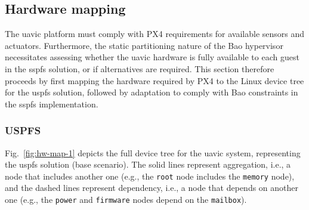 

\subsection{Hardware mapping}
\label{sec:hardware-mapping}
The \gls{uavic} platform must comply with PX4 requirements for available
sensors and actuators. Furthermore, the static partitioning nature of the
Bao hypervisor necessitates assessing whether the \gls{uavic} hardware is fully
available to each guest in the \gls{sspfs} solution, or if alternatives are
required. This section therefore proceeds by first mapping the hardware required
by PX4 to the Linux device tree for the \gls{uspfs} solution, followed by
adaptation to comply with Bao constraints in the \gls{sspfs} implementation.


\subsubsection{USPFS}
\label{sec:base-scenario}
Fig.~\ref{fig:hw-map-1} depicts the full device tree for the \gls{uavic} system,
representing the \gls{uspfs} solution (base scenario).
The solid lines represent aggregation, i.e., a node that includes another one
(e.g., the \lstinline{root} node includes the \lstinline{memory} node), and the
dashed lines represent dependency, i.e., a node that depends on another one
(e.g., the \lstinline{power} and \lstinline{firmware} nodes depend on the
\lstinline{mailbox}).

